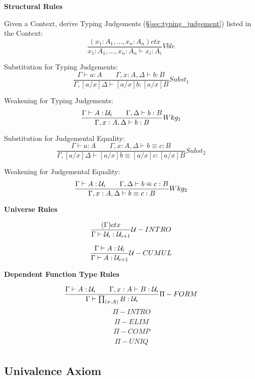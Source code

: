 \textbf{Structural Rules}

Given a Context, derive Typing Judgements
(\S\ref{sec:typing_judgement}) listed in the Context:
\[
  {
    \frac
    {(x_1:A_1, \ldots, x_n:A_n)ctx}
    {x_1:A_1, \ldots, x_n:A_n \vdash x_i:A_i}
  } Vble
\]

Substitution for Typing Judgements:
\[
  {
    \frac
    {\Gamma \vdash a : A \;\;\;\;\;\;\;
    \Gamma,x:A,\Delta \vdash b : B}
    {\Gamma,[a/x]\Delta \vdash [a/x]b : [a/x]B}
  } Subst_1
\]

Weakening for Typing Judgements:
\[
  {
    \frac
    {\Gamma \vdash A : \mathcal{U}_i \;\;\;\;\;\;\;
    \Gamma,\Delta \vdash b : B}
    {\Gamma,x:A,\Delta \vdash b:B}
  } Wkg_1
\]

Substitution for Judgemental Equality:
\[
  {
    \frac
    {\Gamma \vdash a : A \;\;\;\;\;\;\;
    \Gamma,x:A,\Delta \vdash b \equiv c : B}
    {\Gamma,[a/x]\Delta \vdash [a/x]b \equiv [a/x]c : [a/x]B}
  } Subst_2
\]

Weakening for Judgemental Equality:
\[
  {
    \frac
    {\Gamma \vdash A : \mathcal{U}_i \;\;\;\;\;\;\;
    \Gamma,\Delta \vdash b \equiv c : B}
    {\Gamma, x:A, \Delta \vdash b \equiv c : B}
  } Wkg_2
\]



\textbf{Universe Rules}

\[
  {
    \frac
    {(\Gamma) ctx}
    {\Gamma \vdash \mathcal{U}_i : \mathcal{U}_{i+1}}
  } \mathcal{U}-INTRO
\]

\[
  {
    \frac
    {\Gamma \vdash A : \mathcal{U}_i}
    {\Gamma \vdash A : \mathcal{U}_{i+1}}
  } \mathcal{U}-CUMUL
\]



\textbf{Dependent Function Type Rules}

\[
  {
    \frac
    {\Gamma \vdash A : \mathcal{U}_i \;\;\;\;\;\;\;
    \Gamma,x:A \vdash B : \mathcal{U}_i}
    {\Gamma \vdash \prod_{(x:A)} B : \mathcal{U}_i}
  } \Pi-FORM
\]\[
  {
    \frac
    {}
    {}
  } \Pi-INTRO
\]\[
  {
    \frac
    {}
    {}
  } \Pi-ELIM
\]\[
  {
    \frac
    {}
    {}
  } \Pi-COMP
\]\[
  {
    \frac
    {}
    {}
  } \Pi-UNIQ
\]



\subsection{Univalence Axiom}\label{sec:univalence_axiom}

